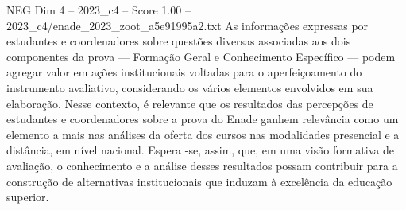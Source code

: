 \begin{textsample}{NEG Dim 4 – 2023\_c4 – Score 1.00 – 2023\_c4/enade\_2023\_zoot\_a5e91995a2.txt}
As informações expressas por estudantes e coordenadores sobre questões diversas associadas aos dois componentes da prova — Formação Geral e Conhecimento Específico — podem agregar valor em ações institucionais voltadas para o aperfeiçoamento do instrumento avaliativo, considerando os vários elementos envolvidos em sua elaboração.
Nesse contexto, é relevante que os resultados das percepções de estudantes e coordenadores sobre a prova do Enade ganhem relevância como um elemento a mais nas análises da oferta dos cursos nas modalidades presencial e a distância, em nível nacional.
Espera -se, assim, que, em uma visão formativa de avaliação, o conhecimento e a análise desses resultados possam contribuir para a construção de alternativas institucionais que induzam à excelência da educação superior.

\end{textsample}
